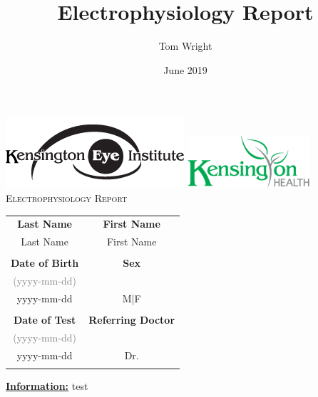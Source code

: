 \documentclass[12pt]{article}
\title{Electrophysiology Report}
\author{Tom Wright}
\date{June 2019}
\newcommand{\fname}{First Name}
\newcommand{\lname}{Last Name}
\newcommand{\dob}{yyyy-mm-dd}
\newcommand{\sex}{M|F}
\newcommand{\testdate}{yyyy-mm-dd}
\newcommand{\doctor}{Dr.}
\newenvironment{boxed}
{\noindent\begin{lrbox}{\mybox}\begin{minipage}{\textwidth}}
{\end{minipage}\end{lrbox}\fbox{\usebox{\mybox}}}
\begin{document}
\thispagestyle{plain}
    \centering
    \begin{minipage}[t][6cm][t]{.3\textwidth}
		\raggedleft
        \includegraphics[width=\textwidth]{keilogo}
        \includegraphics[width=\textwidth]{khlogo}
			\textsc{Electrophysiology Report}

    \end{minipage}%
	\begin{minipage}[t][6cm][t]{.5\textwidth}
		\centering
		\large
		\begin{tabular}{|c c|}
			\hline
			\textbf{Last Name} & \textbf{First Name} \\
   		\lname{} & \fname{} \\
			& \\
		   \textbf{Date of Birth} & \textbf{Sex} \\
		   \textcolor{gray}{(yyyy-mm-dd)} &  \\
    		\dob{} & \sex{} \\
			& \\
    		\textbf{Date of Test} & \textbf{Referring Doctor} \\
		   \textcolor{gray}{(yyyy-mm-dd)} &  \\
			\testdate{} & \doctor{} \\
			& \\
    		\hline
		\end{tabular}
	\end{minipage}
\begin{boxed}
\underline{\textbf{Information:}} 
test
\end{boxed}
\end{document}

